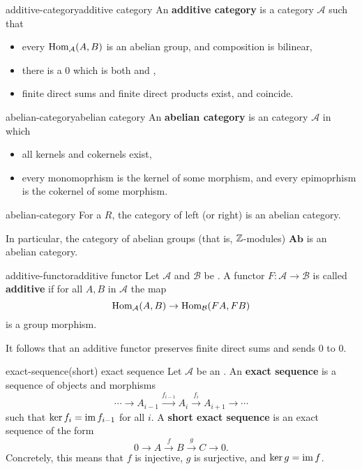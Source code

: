\begin{topic}{additive-category}{additive category}
    An \textbf{additive category} is a category $\mathcal{A}$ such that
    \begin{itemize}
        \item every $\text{Hom}_\mathcal{A}(A, B)$ is an abelian group, and composition is bilinear,
        \item there is a  $0$ which is both  and ,
        \item finite direct sums and finite direct products exist, and coincide.
    \end{itemize}
\end{topic}

\begin{topic}{abelian-category}{abelian category}
    An \textbf{abelian category} is an  category $\mathcal{A}$ in which
    \begin{itemize}
        \item all kernels and cokernels exist,
        \item every monomoprhism is the kernel of some morphism, and every epimoprhism is the cokernel of some morphism.
    \end{itemize}
\end{topic}

\begin{example}{abelian-category}
    For a  $R$, the category of left (or right)  is an abelian category.
    
    In particular, the category of abelian groups (that is, $\mathbb{Z}$-modules) $\textbf{Ab}$ is an abelian category.
\end{example}

\begin{topic}{additive-functor}{additive functor}
    Let $\mathcal{A}$ and $\mathcal{B}$ be . A functor $F : \mathcal{A} \to \mathcal{B}$ is called \textbf{additive} if for all $A, B$ in $\mathcal{A}$ the map
    \[ \text{Hom}_\mathcal{A}(A, B) \to \text{Hom}_\mathcal{B}(FA, FB) \]
    is a group morphism.
    
    It follows that an additive functor preserves finite direct sums and sends $0$ to $0$.
\end{topic}

\begin{topic}{exact-sequence}{(short) exact sequence}
    Let $\mathcal{A}$ be an . An \textbf{exact sequence} is a sequence of objects and morphisms
    \[ \cdots \rightarrow A_{i - 1} \xrightarrow{f_{i - 1}} A_i \xrightarrow{f_i} A_{i + 1} \rightarrow \cdots \]
    such that $\ker f_i = \operatorname{im} f_{i - 1}$ for all $i$.
    A \textbf{short exact sequence} is an exact sequence of the form
    \[ 0 \to A \xrightarrow{f} B \xrightarrow{g} C \to 0 . \]
    Concretely, this means that $f$ is injective, $g$ is surjective, and $\ker g = \operatorname{im} f$.
\end{topic}

